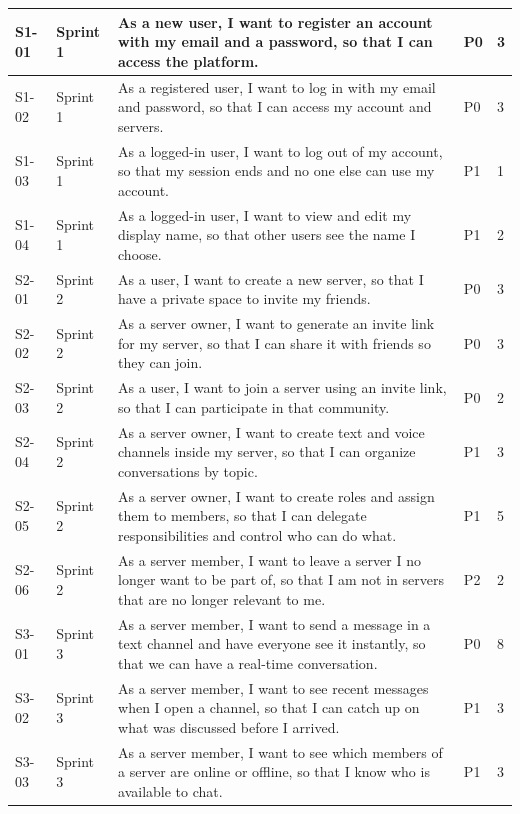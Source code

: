 \begin{longtable}{| p{1.2cm} | p{1.8cm} | p{10.0cm} | p{1.8cm} | p{1.2cm} |}
    S1-01 & Sprint 1 & As a new user, I want to register an account with my email and a password, so that I can access the platform. & P0 & 3 \\
    \hline
    S1-02 & Sprint 1 & As a registered user, I want to log in with my email and password, so that I can access my account and servers. & P0 & 3 \\
    \hline
    S1-03 & Sprint 1 & As a logged-in user, I want to log out of my account, so that my session ends and no one else can use my account. & P1 & 1 \\
    \hline
    S1-04 & Sprint 1 & As a logged-in user, I want to view and edit my display name, so that other users see the name I choose. & P1 & 2 \\
    \hline
    S2-01 & Sprint 2 & As a user, I want to create a new server, so that I have a private space to invite my friends. & P0 & 3 \\
    \hline
    S2-02 & Sprint 2 & As a server owner, I want to generate an invite link for my server, so that I can share it with friends so they can join. & P0 & 3 \\
    \hline
    S2-03 & Sprint 2 & As a user, I want to join a server using an invite link, so that I can participate in that community. & P0 & 2 \\
    \hline
    S2-04 & Sprint 2 & As a server owner, I want to create text and voice channels inside my server, so that I can organize conversations by topic. & P1 & 3 \\
    \hline
    S2-05 & Sprint 2 & As a server owner, I want to create roles and assign them to members, so that I can delegate responsibilities and control who can do what. & P1 & 5 \\
    \hline
    S2-06 & Sprint 2 & As a server member, I want to leave a server I no longer want to be part of, so that I am not in servers that are no longer relevant to me. & P2 & 2 \\
    \hline
    S3-01 & Sprint 3 & As a server member, I want to send a message in a text channel and have everyone see it instantly, so that we can have a real-time conversation. & P0 & 8 \\
    \hline
    S3-02 & Sprint 3 & As a server member, I want to see recent messages when I open a channel, so that I can catch up on what was discussed before I arrived. & P1 & 3 \\
    \hline
    S3-03 & Sprint 3 & As a server member, I want to see which members of a server are online or offline, so that I know who is available to chat. & P1 & 3 \\

\end{longtable}
